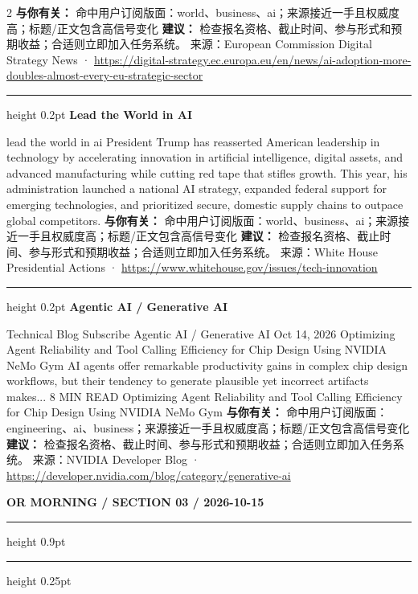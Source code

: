 \documentclass[10.5pt]{ctexart}
\begin{document}
\begin{multicols}{2}
\textbf{与你有关：} 命中用户订阅版面：world、business、ai；来源接近一手且权威度高；标题/正文包含高信号变化
\textbf{建议：} 检查报名资格、截止时间、参与形式和预期收益；合适则立即加入任务系统。
{\footnotesize\color{ormuted} 来源：European Commission Digital Strategy News · \url{https://digital-strategy.ec.europa.eu/en/news/ai-adoption-more-doubles-almost-every-eu-strategic-sector}}
\vspace{2mm}
\hrule height 0.2pt
\vspace{2mm}
{\large\bfseries Lead the World in AI}\par
lead the world in ai President Trump has reasserted American leadership in technology by accelerating innovation in artificial intelligence, digital assets, and advanced manufacturing while cutting red tape that stifles growth. This year, his administration launched a national AI strategy, expanded federal support for emerging technologies, and prioritized secure, domestic supply chains to outpace global competitors.
\textbf{与你有关：} 命中用户订阅版面：world、business、ai；来源接近一手且权威度高；标题/正文包含高信号变化
\textbf{建议：} 检查报名资格、截止时间、参与形式和预期收益；合适则立即加入任务系统。
{\footnotesize\color{ormuted} 来源：White House Presidential Actions · \url{https://www.whitehouse.gov/issues/tech-innovation}}
\vspace{2mm}
\hrule height 0.2pt
\vspace{2mm}
{\large\bfseries Agentic AI / Generative AI}\par
Technical Blog Subscribe Agentic AI / Generative AI Oct 14, 2026 Optimizing Agent Reliability and Tool Calling Efficiency for Chip Design Using NVIDIA NeMo Gym AI agents offer remarkable productivity gains in complex chip design workflows, but their tendency to generate plausible yet incorrect artifacts makes... 8 MIN READ Optimizing Agent Reliability and Tool Calling Efficiency for Chip Design Using NVIDIA NeMo Gym 
\textbf{与你有关：} 命中用户订阅版面：engineering、ai、business；来源接近一手且权威度高；标题/正文包含高信号变化
\textbf{建议：} 检查报名资格、截止时间、参与形式和预期收益；合适则立即加入任务系统。
{\footnotesize\color{ormuted} 来源：NVIDIA Developer Blog · \url{https://developer.nvidia.com/blog/category/generative-ai}}
\end{multicols}
\newpage
{\small\bfseries OR MORNING / SECTION 03 / 2026-10-15}
\vspace{2mm}
\hrule height 0.9pt
\vspace{1.5mm}
\hrule height 0.25pt
\vspace{4mm}
\end{document}

